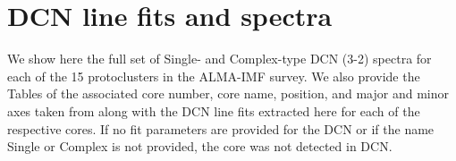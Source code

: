 \section{DCN line fits and spectra}
\label{appendix:spectral}
We show here the full set of Single- and Complex-type DCN (3-2) spectra for each of the 15 protoclusters in the ALMA-IMF survey. We also provide the Tables of the associated core number, core name, position, and major and minor axes taken from \citet{louvet22} along with the DCN line fits extracted here for each of the respective cores. If no fit parameters are provided for the DCN or if the name Single or Complex is not provided, the core was not detected in DCN. 










\clearpage




\clearpage

